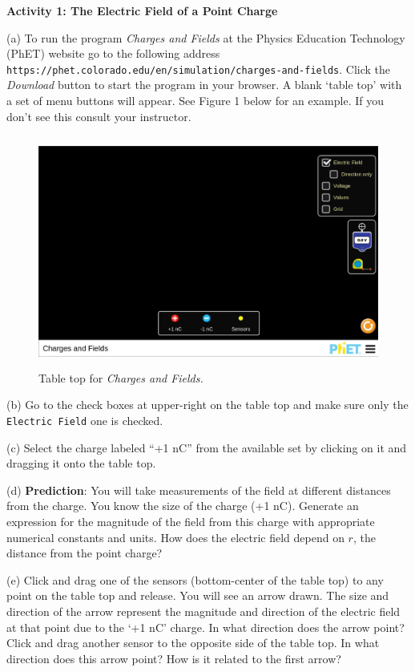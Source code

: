 \textbf{Activity 1: The Electric Field of a Point Charge}

(a) To run the program {\it Charges and Fields} at the Physics Education Technology (PhET)
website go to the following address {\tt https://phet.colorado.edu/en/simulation/charges-and-fields}.
Click the {\it Download} button to start the program in your browser.
A blank `table top' with a set of menu 
buttons will appear. See Figure 1 below for an example.
If you don't see this consult your instructor.

\begin{figure}[hbt]
\begin{center}
\includegraphics[height=3.0in]{chargesFields1/chargesFieldFig1.eps}
\caption{Table top for {\it Charges and Fields.}}
\end{center}
\end{figure}

(b) Go to the check boxes at upper-right on the table top and make sure only the {\tt Electric Field}
one is checked.

(c) Select the charge labeled {}``+1 nC'' from the available set by clicking
on it and dragging it onto the table top. 

(d) \textbf{Prediction}: You will take measurements of the field at different
distances from the charge. You know the size of the
charge (+1 nC).
Generate an expression for the magnitude of the field from this charge
with appropriate numerical constants and units.
How does the electric field depend on $r$, the distance from the point charge?
\newpage

\vspace{-30mm}

(e) Click and drag one of the sensors (bottom-center of the table top)
to any point on the table top and release. You will see an arrow drawn.
The size and direction of the arrow represent the magnitude and direction of
the electric field at that point due to the `+1 nC' charge.
In what direction does the arrow point?
Click and drag another sensor to the opposite side of the table top.
In what direction does this arrow point? How is it related to the first arrow?
\vspace{15mm}

